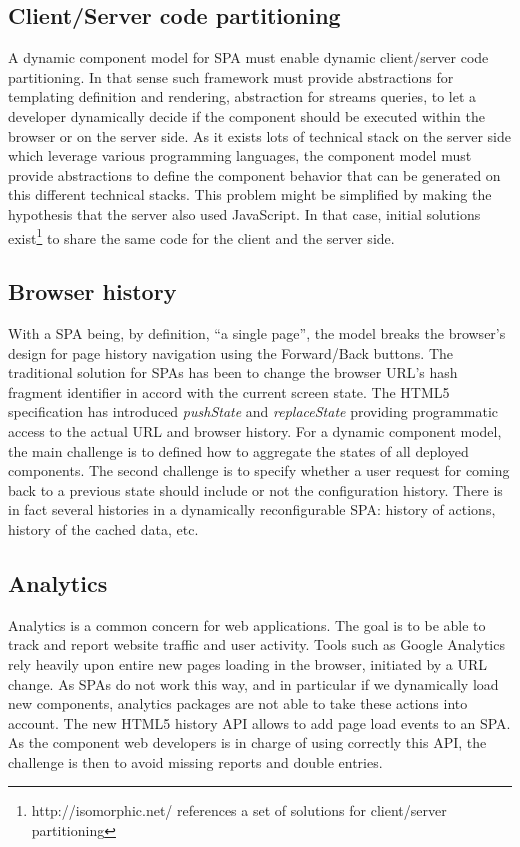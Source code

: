 \subsection{Client/Server code partitioning}
A dynamic component model for SPA must enable dynamic client/server code partitioning. In that sense such framework must provide abstractions for templating definition and rendering, abstraction for streams queries, to let a developer dynamically decide if the component should be executed within the browser or on the server side. As it exists lots of technical stack on the server side which leverage various programming languages, the component model must provide abstractions to define the component behavior that can be generated on this different technical stacks. This problem might be simplified by making the hypothesis that the server also used JavaScript. In that case, initial solutions exist\footnote{http://isomorphic.net/ references a set of solutions for client/server partitioning} to share the same code for the client and the server side.

\subsection{Browser history}
With a SPA being, by definition, ``a single page'', the model breaks the browser's design for page history navigation using the Forward/Back buttons. The traditional solution for SPAs has been to change the browser URL's hash fragment identifier in accord with the current screen state.
The HTML5 specification has introduced \textit{pushState} and \textit{replaceState} providing programmatic access to the actual URL and browser history.
For a dynamic component model, the main challenge is to defined how to aggregate the states of all deployed components.
The second challenge is to specify whether a user request for coming back to a previous state should include or not the configuration history.
There is in fact several histories in a dynamically reconfigurable SPA: history of actions, history of the cached data, etc.



\subsection{Analytics}

Analytics is a common concern for web applications. The goal is to be able to track and report website traffic and user activity.
Tools such as Google Analytics rely heavily upon entire new pages loading in the browser, initiated by a URL change. As SPAs do not work this way, and in particular if we dynamically load new components, analytics packages are not able to take these actions into account.
The new HTML5 history API allows to add page load events to an SPA.
As the component web developers is in charge of using correctly this API, the challenge is then to avoid missing reports and double entries.

